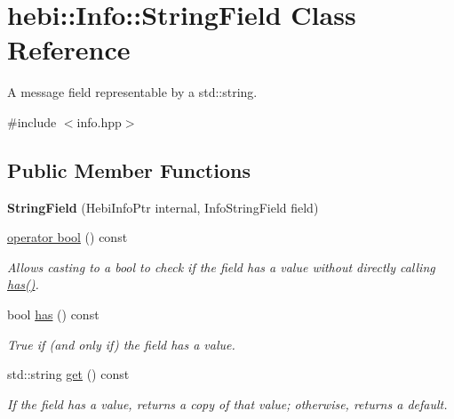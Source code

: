 \hypertarget{classhebi_1_1Info_1_1StringField}{}\section{hebi\+:\+:Info\+:\+:String\+Field Class Reference}
\label{classhebi_1_1Info_1_1StringField}


A message field representable by a std\+::string.  




{\ttfamily \#include $<$info.\+hpp$>$}

\subsection*{Public Member Functions}
\begin{DoxyCompactItemize}
\item 
{\bfseries String\+Field} (Hebi\+Info\+Ptr internal, Info\+String\+Field field)\hypertarget{classhebi_1_1Info_1_1StringField_a4a864517189aed3d613b6c55d92b6572}{}\label{classhebi_1_1Info_1_1StringField_a4a864517189aed3d613b6c55d92b6572}

\item 
\hyperlink{classhebi_1_1Info_1_1StringField_a04db0b8f4a982f083fd0ff4f5b49a6de}{operator bool} () const 
\begin{DoxyCompactList}\small\item\em Allows casting to a bool to check if the field has a value without directly calling {\ttfamily \hyperlink{classhebi_1_1Info_1_1StringField_aeb87dc356ac5284f12f461410151881f}{has()}}. \end{DoxyCompactList}\item 
bool \hyperlink{classhebi_1_1Info_1_1StringField_aeb87dc356ac5284f12f461410151881f}{has} () const \hypertarget{classhebi_1_1Info_1_1StringField_aeb87dc356ac5284f12f461410151881f}{}\label{classhebi_1_1Info_1_1StringField_aeb87dc356ac5284f12f461410151881f}

\begin{DoxyCompactList}\small\item\em True if (and only if) the field has a value. \end{DoxyCompactList}\item 
std\+::string \hyperlink{classhebi_1_1Info_1_1StringField_a6727fa4c435be34e94021ab87513e66a}{get} () const \hypertarget{classhebi_1_1Info_1_1StringField_a6727fa4c435be34e94021ab87513e66a}{}\label{classhebi_1_1Info_1_1StringField_a6727fa4c435be34e94021ab87513e66a}

\begin{DoxyCompactList}\small\item\em If the field has a value, returns a copy of that value; otherwise, returns a default. \end{DoxyCompactList}\end{DoxyCompactItemize}


